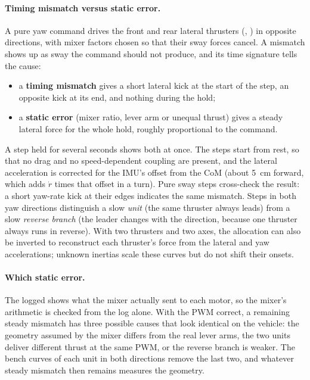 \begin{revised}[title=Added 30 October 2026,breakable]
\paragraph{Timing mismatch versus static error.} A pure yaw command drives the front and rear
lateral thrusters (, ) in opposite directions, with mixer factors chosen
so that their sway forces cancel. A mismatch shows up as sway the command should not produce, and
its time signature tells the cause:
\begin{itemize}
  \item a \textbf{timing mismatch} gives a short lateral kick at the start of the step, an
        opposite kick at its end, and nothing during the hold;
  \item a \textbf{static error} (mixer ratio, lever arm or unequal thrust) gives a steady lateral
        force for the whole hold, roughly proportional to the command.
\end{itemize}
A step held for several seconds shows both at once. The steps start from rest, so that no drag
and no speed-dependent coupling are present, and the lateral acceleration is corrected for the
IMU's offset from the CoM (about \qty{5}{\centi\meter} forward, which adds $\dot r$ times that
offset in a turn). Pure sway steps cross-check the result: a short yaw-rate kick at their edges
indicates the same mismatch. Steps in both yaw directions distinguish a slow \emph{unit} (the
same thruster always leads) from a slow \emph{reverse branch} (the leader changes with the
direction, because one thruster always runs in reverse). With two thrusters and two axes, the
allocation can also be inverted to reconstruct each thruster's force from the lateral and yaw
accelerations; unknown inertias scale these curves but do not shift their onsets.

\paragraph{Which static error.} The logged  shows what the mixer actually
sent to each motor, so the mixer's arithmetic is checked from the log alone. With the PWM correct,
a remaining steady mismatch has three possible causes that look identical on the vehicle: the
geometry assumed by the mixer differs from the real lever arms, the two units deliver different
thrust at the same PWM, or the reverse branch is weaker. The bench curves of each unit in both
directions remove the last two, and whatever steady mismatch then remains measures the geometry.


\end{revised}
